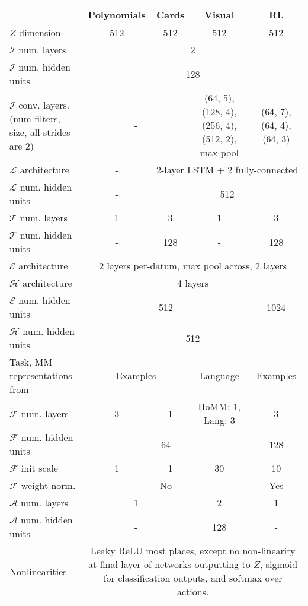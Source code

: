 \begin{table}
\scriptsize
\centering
\begin{tabular}{|p{3cm}||c|c|c|c|}
\hline
& Polynomials & Cards & Visual & RL \\\hline
\hline
$Z$-dimension & 512 & 512 & 512 & 512 \\\hline
$\mathcal{I}$ num. layers & \multicolumn{4}{c|}{2} \\\hline
$\mathcal{I}$ num. hidden units & \multicolumn{4}{c|}{128} \\\hline
$\mathcal{I}$ conv. layers. (num filters, size, all strides are 2) & \multicolumn{2}{c|}{-} & \multicolumn{1}{p{2.3cm}|}{(64, 5), (128, 4), (256, 4), (512, 2), max pool} & \multicolumn{1}{p{2.3cm}|}{(64, 7), (64, 4), (64, 3)}\\\hline
$\mathcal{L}$ architecture & -  & \multicolumn{3}{c|}{2-layer LSTM + 2 fully-connected} \\\hline
$\mathcal{L}$ num. hidden units & -  & \multicolumn{3}{c|}{512} \\\hline
$\mathcal{T}$ num. layers & 1 & 3 & 1 & 3 \\\hline
$\mathcal{T}$ num. hidden units & - & 128 & - & 128 \\\hline
$\mathcal{E}$ architecture & \multicolumn{4}{c|}{2 layers per-datum, max pool across, 2 layers} \\\hline
$\mathcal{H}$ architecture & \multicolumn{4}{c|}{4 layers} \\\hline
$\mathcal{E}$ num. hidden units & \multicolumn{3}{c|}{512} & 1024 \\\hline
$\mathcal{H}$ num. hidden units & \multicolumn{4}{c|}{512} \\\hline
Task, MM representations from & \multicolumn{2}{c|}{Examples} & Language & Examples \\\hline
$\mathcal{F}$ num. layers & 3 & 1 & HoMM: 1, Lang: 3 & 3 \\\hline
$\mathcal{F}$ num. hidden units & \multicolumn{3}{c|}{64} & 128 \\\hline
$\mathcal{F}$ init scale & 1 & 1 & 30 & 10 \\\hline
$\mathcal{F}$ weight norm. \citep{Salimans2016} & \multicolumn{3}{c|}{No} & Yes \\\hline
$\mathcal{A}$ num. layers & \multicolumn{2}{c|}{1} & 2 & 1 \\\hline
$\mathcal{A}$ num. hidden units & \multicolumn{2}{c|}{-} & 128 & -  \\\hline
Nonlinearities & \multicolumn{4}{p{11cm}|}{Leaky ReLU most places, except no non-linearity at final layer of networks outputting to $Z$, sigmoid for classification outputs, and softmax over actions.} \\\hline

\end{tabular}
\end{table}

